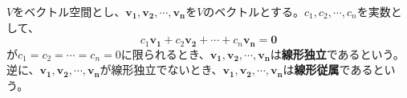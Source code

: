 \documentclass{jlreq}
\begin{document}
\begin{definitionbox}[線形独立と線形従属]
  $V$をベクトル空間とし、$\boldsymbol{v_1}, \boldsymbol{v_2}, \cdots, \boldsymbol{v_n}$を$V$のベクトルとする。$c_1, c_2, \cdots, c_n$を実数として、
  \begin{equation*}
    c_1 \boldsymbol{v_1} + c_2 \boldsymbol{v_2} + \cdots + c_n \boldsymbol{v_n} = \boldsymbol{0}
  \end{equation*}
  が$c_1 = c_2 = \cdots = c_n = 0$に限られるとき、$\boldsymbol{v_1}, \boldsymbol{v_2}, \cdots, \boldsymbol{v_n}$は\textbf{線形独立}であるという。 \\
  逆に、$\boldsymbol{v_1}, \boldsymbol{v_2}, \cdots, \boldsymbol{v_n}$が線形独立でないとき、$\boldsymbol{v_1}, \boldsymbol{v_2}, \cdots, \boldsymbol{v_n}$は\textbf{線形従属}であるという。
\end{definitionbox}
\end{document}
